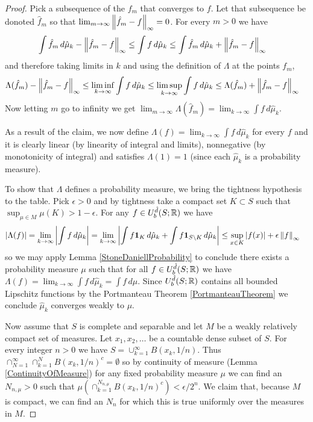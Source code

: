 \begin{proof}
Pick a subsequence of the $f_m$ that converges to $f$.  Let that
subsequence be donoted $\hat{f}_m$ so that $\lim_{m \to \infty} \left \lVert \hat{f}_m -
  f \right \rVert_\infty = 0$.  For every $m > 0$ we have
\begin{align*}
\int \hat{f}_m \, d \hat{\mu}_k -\left \lVert \hat{f}_m - f \right \rVert_\infty &\leq 
\int f \, d\hat{\mu}_k \leq \int \hat{f}_m \, d \hat{\mu}_k + \left \lVert \hat{f}_m - f \right \rVert_\infty
\end{align*}
and therefore taking limits in $k$ and using the definition of
$\Lambda$ at the points $f_m$,
\begin{align*}
\Lambda(\hat{f}_m) -\left \lVert \hat{f}_m - f \right \rVert_\infty 
&\leq \liminf_{k \to \infty} \int f \, d\hat{\mu}_k 
\leq \limsup_{k \to \infty} \int f \, d\hat{\mu}_k 
\leq \Lambda(\hat{f}_m) + \left \lVert \hat{f}_m - f \right \rVert_\infty
\end{align*}
Now letting $m$ go to infinity we get $\lim_{m \to \infty}
\Lambda(\hat{f}_m) = \lim_{k \to \infty} \int f \, d\hat{\mu}_k$.

As a result of the claim, we now define $\Lambda(f) = \lim_{k \to
  \infty} \int f \, d\hat{\mu}_{k}$ for every $f$  and it is clearly
linear (by linearity of integral and limits), nonnegative (by
monotonicity of integral) and satisfies $\Lambda(1) = 1$ (since each $\hat{\mu}_k$
is a probability measure).  

To show that $\Lambda$ defines a probability measure, we bring the
tightness hypothesis to the table.  Pick $\epsilon > 0$ and by
tightness take a compact set $K \subset S$ such that $\sup_{\mu \in M}
\mu(K) > 1 - \epsilon$.  For any $f \in U_b^{\hat{d}}(S ; \mathbb{R})$ we
have
\begin{align*}
\left \vert \Lambda(f) \right \vert 
&= \lim_{k \to \infty} \left \vert \int f \, d\hat{\mu}_k \right \vert
= \lim_{k \to \infty} \left \vert \int f \textbf{1}_{K} \, d\hat{\mu}_k +
\int f \textbf{1}_{S \setminus K} \, d\hat{\mu}_k \right \vert \leq \sup_{x
\in K} \left \vert f(x) \right \vert + \epsilon \left \lVert f \right \rVert_\infty
\end{align*}
so we may apply Lemma \ref{StoneDaniellProbability} to conclude there
exists a probability measure $\mu$ such that for all $f \in U_b^{\hat{d}}(S ; \mathbb{R})$ we
have $\Lambda(f) =  \lim_{k \to \infty} \int f \, d\hat{\mu}_k =
\int f \, d\mu$.  Since $U_b^{\hat{d}}(S ; \mathbb{R})$ contains all
bounded Lipschitz functions by the Portmanteau Theorem
\ref{PortmanteauTheorem} we conclude $\hat{\mu}_k$ converges weakly to
$\mu$.

Now assume that $S$ is complete and separable and let $M$ be a weakly
relatively compact set of measures.  Let $x_1, x_2, \dotsc$ be a countable dense
subset of $S$.  For every integer $n > 0$ we have $S =
\cup_{k=1}^\infty B(x_k, 1/n)$.  Thus $\cap_{N=1}^\infty \cap_{k=1}^N
B(x_k, 1/n)^c = \emptyset$ so by continuity of measure (Lemma
\ref{ContinuityOfMeasure}) for any fixed probability measure $\mu$ we
can find an $N_{n, \mu} > 0$ such that $\mu(\cap_{k=1}^{N_{n, \mu}}
B(x_k, 1/n)^c ) < \epsilon/2^n$.  We claim that, because $M$ is
compact, we can find an $N_n$ for
which this is true uniformly over the measures in $M$.


\end{proof}
